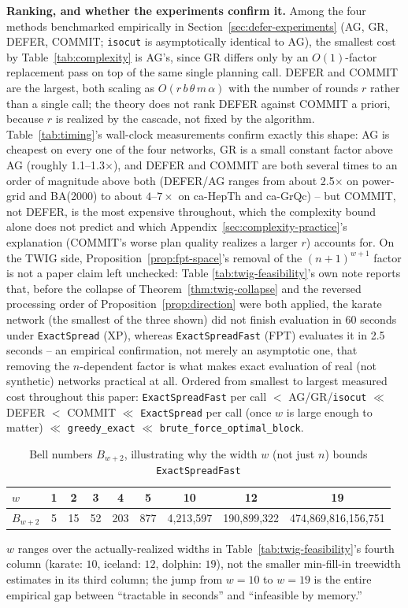 \documentclass[ASNA,number]{USG}
\newcommand{\up}{\rule{0pt}{2.6ex}}
\newcommand{\down}{\rule[-1.2ex]{0pt}{0pt}}
\begin{document}
\textbf{Ranking, and whether the experiments confirm it.} Among the four
methods benchmarked empirically in Section~\ref{sec:defer-experiments}
(AG, GR, DEFER, COMMIT; \texttt{isocut} is asymptotically identical to AG),
the smallest cost by Table~\ref{tab:complexity} is AG's, since GR differs
only by an $O(1)$-factor replacement pass on top of the same single
planning call. DEFER and COMMIT are the largest, both scaling as
$O(r\,b\,\theta\,m\,\alpha)$ with the number of rounds $r$ rather than a
single call; the theory does not rank DEFER against COMMIT a priori,
because $r$ is realized by the cascade, not fixed by the algorithm.
Table~\ref{tab:timing}'s wall-clock measurements confirm
exactly this shape: AG is cheapest on every one of the four networks, GR
is a small constant factor above AG (roughly 1.1--1.3$\times$), and DEFER
and COMMIT are both several times to an order of magnitude above both
(DEFER/AG ranges from about 2.5$\times$ on power-grid and BA(2000) to
about $4$--$7\times$ on ca-HepTh and ca-GrQc) -- but COMMIT, not DEFER, is
the most expensive throughout, which the complexity bound alone does not
predict and which Appendix~\ref{sec:complexity-practice}'s
explanation (COMMIT's worse plan quality realizes a larger $r$) accounts
for. On the TWIG side, Proposition~\ref{prop:fpt-space}'s removal of the
$(n+1)^{w+1}$ factor is not a paper claim left unchecked: Table
\ref{tab:twig-feasibility}'s own note reports that, before the collapse of
Theorem~\ref{thm:twig-collapse} and the reversed processing order of
Proposition~\ref{prop:direction} were both applied, the karate network
(the smallest of the three shown) did not finish evaluation in 60 seconds
under \texttt{ExactSpread} (XP), whereas \texttt{ExactSpreadFast} (FPT)
evaluates it in 2.5 seconds -- an empirical confirmation, not merely an
asymptotic one, that removing the $n$-dependent factor is what makes exact
evaluation of real (not synthetic) networks practical at all. Ordered from
smallest to largest measured cost throughout this paper:
\texttt{ExactSpreadFast} per call $<$ AG/GR/\texttt{isocut}
$\ll$ DEFER $<$ COMMIT $\ll$ \texttt{ExactSpread} per call (once $w$ is
large enough to matter) $\ll$ \texttt{greedy\_exact}
$\ll$ \texttt{brute\_force\_optimal\_block}.

\begin{table}[h]
\centering
\caption{Bell numbers $B_{w+2}$, illustrating why the width $w$ (not just $n$) bounds \texttt{ExactSpreadFast}\label{tab:bell-numbers}}
\begin{tabular}{@{}lcccccccc@{}}
\hline
\up $w$ & 1 & 2 & 3 & 4 & 5 & 10 & 12 & 19 \\
\hline
\down $B_{w+2}$ & 5 & 15 & 52 & 203 & 877 & 4{,}213{,}597 & 190{,}899{,}322 & 474{,}869{,}816{,}156{,}751 \\
\hline
\end{tabular}
$w$ ranges over the actually-realized widths in
Table~\ref{tab:twig-feasibility}'s fourth column (karate: $10$, iceland:
$12$, dolphin: $19$), not the smaller min-fill-in treewidth estimates in
its third column; the jump from $w=10$ to $w=19$ is the entire empirical
gap between ``tractable in seconds'' and ``infeasible by memory.''
\end{table}
\end{document}
